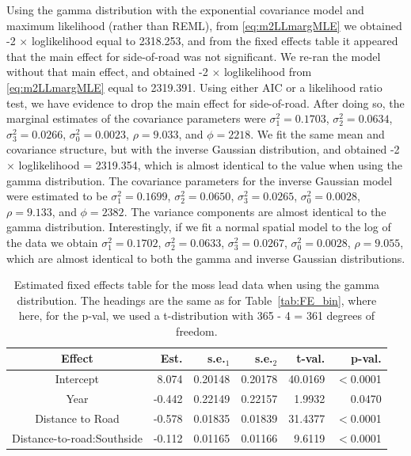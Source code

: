 \documentclass[12pt, titlepage]{article}
\begin{document}
Using the gamma distribution with the exponential covariance model and maximum likelihood (rather than REML), from \eqref{eq:m2LLmargMLE} we obtained -2 $\times$ loglikelihood equal to 2318.253, and from the fixed effects table it appeared that the main effect for side-of-road was not significant.  We re-ran the model without that main effect, and obtained -2 $\times$ loglikelihood from \eqref{eq:m2LLmargMLE} equal to 2319.391.  Using either AIC or a likelihood ratio test, we have evidence to drop the main effect for side-of-road.  After doing so, the marginal estimates of the covariance parameters were $\sigma^{2}_{1} = 0.1703$, $\sigma^{2}_{2} = 0.0634$, $\sigma^{2}_{3} = 0.0266$, $\sigma^{2}_{0} = 0.0023$, $\rho = 9.033$, and $\phi = 2218$.  We fit the same mean and covariance structure, but with the inverse Gaussian distribution, and obtained -2 $\times$ loglikelihood = 2319.354, which is almost identical to the value when using the gamma distribution. The covariance parameters for the inverse Gaussian model were estimated to be $\sigma^{2}_{1} = 0.1699$, $\sigma^{2}_{2} = 0.0650$, $\sigma^{2}_{3} = 0.0265$, $\sigma^{2}_{0} = 0.0028$, $\rho = 9.133$, and $\phi = 2382$.  The variance components are almost identical to the gamma distribution.  Interestingly, if we fit a normal spatial model to the log of the data we obtain $\sigma^{2}_{1} = 0.1702$, $\sigma^{2}_{2} = 0.0633$, $\sigma^{2}_{3} = 0.0267$, $\sigma^{2}_{0} = 0.0028$, $\rho = 9.055$, which are almost identical to both the gamma and inverse Gaussian distributions.
\begin{table}[H] 
	\caption{Estimated fixed effects table for the moss lead data when using the gamma distribution. The headings are the same as for Table~\ref{tab:FE_bin}, where here, for the p-val, we used a t-distribution with 365 - 4 = 361 degrees of freedom.    \label{tab:FE_moss}}
\begin{center}
\begin{tabular}{|c|rrrrr|}
\hline
\hline{}
Effect & Est. & s.e.$_{1}$ & s.e.$_{2}$  & t-val. & p-val.  \\
\hline{}
Intercept & 8.074 & 0.20148 & 0.20178 & 40.0169 & $<$0.0001 \\ 
Year & -0.442 & 0.22149 & 0.22157 & 1.9932 & 0.0470 \\ 
Distance to Road & -0.578 & 0.01835 & 0.01839 & 31.4377 & $<$0.0001 \\ 
Distance-to-road:Southside & -0.112 & 0.01165 & 0.01166 & 9.6119 & $<$0.0001 \\ 
\hline
\hline
\end{tabular}
\end{center}
\end{table}
\end{document}
